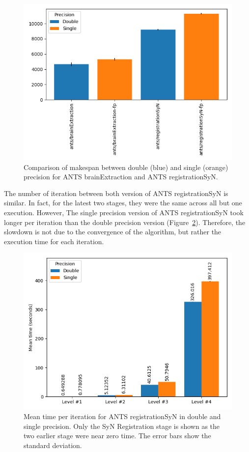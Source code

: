 \documentclass[conference]{IEEEtran}
\begin{document}
\begin{figure}[ht]
	\includegraphics[width=\linewidth]{figures/makespan-ants.png}
	\caption{Comparison of makespan between double (blue) and single (orange) precision for ANTS brainExtraction and ANTS registrationSyN.}
	\label{fig:makespan-ants}
\end{figure}
			
The number of iteration between both version of ANTS registrationSyN is similar. In fact, for the latest two stages, they were the same across all but one execution. However, The single precision version of ANTS registrationSyN took longer per iteration than the double precision version (Figure~\ref{fig:mean-time-per-iteration-ants}). Therefore, the slowdown is not due to the convergence of the algorithm, but rather the execution time for each iteration.

\begin{figure}
	\includegraphics[width=\linewidth]{figures/ants-registrationSyN-iteration-mean.png}
	\caption{Mean time per iteration for ANTS registrationSyN in double and single precision. Only the SyN Registration stage is shown as the two earlier stage were near zero time. The error bars show the standard deviation.}
	\label{fig:mean-time-per-iteration-ants}
\end{figure}
						
\end{document}
